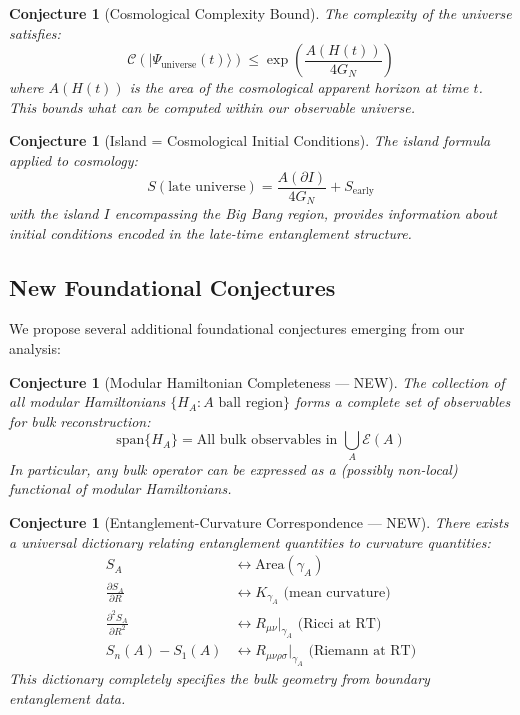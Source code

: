 \documentclass[12pt,a4paper]{article}
\newtheorem{conjecture}[theorem]{Conjecture}
\begin{document}
\begin{conjecture}[Cosmological Complexity Bound]
The complexity of the universe satisfies:
\begin{equation}
\mathcal{C}(|\Psi_{\text{universe}}(t)\rangle) \leq \exp\left( \frac{A(H(t))}{4G_N} \right)
\end{equation}
where $A(H(t))$ is the area of the cosmological apparent horizon at time $t$. This bounds what can be computed within our observable universe.
\end{conjecture}

\begin{conjecture}[Island = Cosmological Initial Conditions]
The island formula applied to cosmology:
\begin{equation}
S(\text{late universe}) = \frac{A(\partial I)}{4G_N} + S_{\text{early}}
\end{equation}
with the island $I$ encompassing the Big Bang region, provides information about initial conditions encoded in the late-time entanglement structure.
\end{conjecture}

\subsection{New Foundational Conjectures}

We propose several additional foundational conjectures emerging from our analysis:

\begin{conjecture}[Modular Hamiltonian Completeness --- NEW]
The collection of all modular Hamiltonians $\{H_A : A \text{ ball region}\}$ forms a complete set of observables for bulk reconstruction:
\begin{equation}
\text{span}\{H_A\} = \text{All bulk observables in } \bigcup_A \mathcal{E}(A)
\end{equation}
In particular, any bulk operator can be expressed as a (possibly non-local) functional of modular Hamiltonians.
\end{conjecture}

\begin{conjecture}[Entanglement-Curvature Correspondence --- NEW]
There exists a universal dictionary relating entanglement quantities to curvature quantities:
\begin{equation}
\begin{aligned}
S_A &\longleftrightarrow \text{Area}(\gamma_A) \\
\frac{\partial S_A}{\partial R} &\longleftrightarrow K_{\gamma_A} \text{ (mean curvature)} \\
\frac{\partial^2 S_A}{\partial R^2} &\longleftrightarrow R_{\mu\nu}|_{\gamma_A} \text{ (Ricci at RT)} \\
S_n(A) - S_1(A) &\longleftrightarrow R_{\mu\nu\rho\sigma}|_{\gamma_A} \text{ (Riemann at RT)}
\end{aligned}
\end{equation}
This dictionary completely specifies the bulk geometry from boundary entanglement data.
\end{conjecture}
\end{document}
